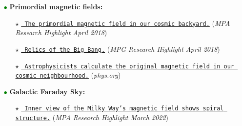 \documentclass[11pt,a4paper,sans, table, dvipsnames]{moderncv}        %
\begin{document}
\begin{itemize}
\item[\textcolor{Green}{$\bullet$}] \textbf{Primordial magnetic fields:}
\vspace{0.2\baselineskip}
\begin{itemize}
\item[\textcolor{Black}{$\star$}]
\href{https://www.mpa-garching.mpg.de/498249/hl201804}{\texttt{{\color{blue} The primordial magnetic field in our cosmic backyard.}}}
(\textit{MPA Research Highlight April 2018}) 
\item[\textcolor{Black}{$\star$}]
\href{https://www.mpg.de/11991394/relics-of-the-big-bang}{\texttt{{\color{blue} Relics of the Big Bang.}}} (\textit{MPG Research Highlight April 2018})
\item[\textcolor{Black}{$\star$}]
\href{https://phys.org/news/2018-04-astrophysicists-magnetic-field-cosmic-neighbourhood.html}{\texttt{{\color{blue} Astrophysicists calculate the original magnetic field in our cosmic neighbourhood.}}} (\textit{phys.org})
\end{itemize}
\vspace{0.4\baselineskip}
\item[\textcolor{Green}{$\bullet$}] \textbf{Galactic Faraday Sky:}
\vspace{0.2\baselineskip}
\begin{itemize}
\item[\textcolor{Black}{$\star$}]
\href{https://www.mpa-garching.mpg.de/1050627/hl202203}{\texttt{{\color{blue} Inner view of the Milky Way’s magnetic field shows spiral structure.}}} (\textit{MPA Research Highlight March 2022})
\end{itemize}
\end{itemize}

\vspace{\baselineskip}
\end{document}
